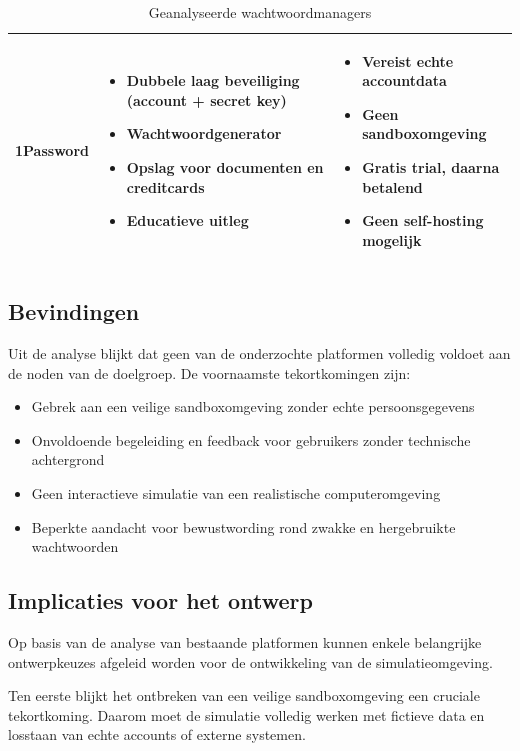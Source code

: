 \begin{table}[H]
\begin{tabularx}{\textwidth}{l X X}
1Password &
\begin{itemize}[leftmargin=*, nosep]
\item Dubbele laag beveiliging (account + secret key)
\item Wachtwoordgenerator
\item Opslag voor documenten en creditcards
\item Educatieve uitleg
\end{itemize}
&
\begin{itemize}[leftmargin=*, nosep]
\item Vereist echte accountdata
\item Geen sandboxomgeving
\item Gratis trial, daarna betalend
\item Geen self-hosting mogelijk
\end{itemize}
\\

\bottomrule
\end{tabularx}
\caption{Geanalyseerde wachtwoordmanagers}
\end{table}

\subsection{Bevindingen}
Uit de analyse blijkt dat geen van de onderzochte platformen volledig voldoet aan de noden van de doelgroep. De voornaamste tekortkomingen zijn:

\begin{itemize}
\item Gebrek aan een veilige sandboxomgeving zonder echte persoonsgegevens
\item Onvoldoende begeleiding en feedback voor gebruikers zonder technische achtergrond
\item Geen interactieve simulatie van een realistische computeromgeving
\item Beperkte aandacht voor bewustwording rond zwakke en hergebruikte wachtwoorden
\end{itemize}

\subsection{Implicaties voor het ontwerp}

Op basis van de analyse van bestaande platformen kunnen enkele belangrijke ontwerpkeuzes afgeleid worden voor de ontwikkeling van de simulatieomgeving.

Ten eerste blijkt het ontbreken van een veilige sandboxomgeving een cruciale tekortkoming. Daarom moet de simulatie volledig werken met fictieve data en losstaan van echte accounts of externe systemen.

